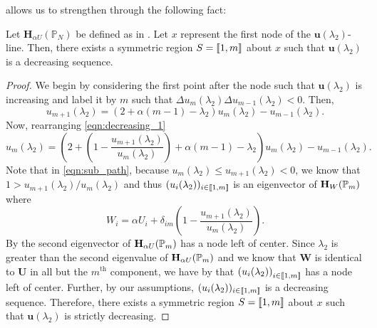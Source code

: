      allows us to strengthen  through the following fact:
        \begin{lem}\label{lem:decreasing_2}
    	Let $\mathbf{H}_{\alpha U}(\mathbb{P}_N)$ be defined as in . Let $x$ represent the first node of the $\mathbf{u}(\lambda_2)$-line. Then, there exists a symmetric region $S=\left \llbracket 1 , m \right \rrbracket$ about $x$ such that $\mathbf{u}(\lambda_2)$ is a decreasing sequence.
    \end{lem}

    \begin{proof}
    	We begin by considering the first point after the node such that $\mathbf{u}(\lambda_2)$ is increasing and label it by $m$ such that $\Delta u_m (\lambda_2) \Delta u_{m-1}(\lambda_2) < 0$. Then,
    	\begin{equation}\label{eqn:decreasing_1}
    		u_{m+1}(\lambda_2) = \left(2 + \alpha (m-1) -\lambda_2\right) u_m(\lambda_2) - u_{m-1}(\lambda_2).
    	\end{equation}
    	Now, rearranging \cref{eqn:decreasing_1}
    	\begin{equation}\label{eqn:sub_path}
    		u_m(\lambda_2) = \left(2 + \left(1 - \frac{u_{m+1}(\lambda_2)}{u_{m}(\lambda_2)}\right) +\alpha (m-1) -\lambda_2\right) u_m(\lambda_2)-u_{m-1}(\lambda_2).
    	\end{equation}
    	Note that in \cref{eqn:sub_path}, because $u_m(\lambda_2)\leq u_{m+1}(\lambda_2)<0$, we know that $1 > u_{m+1}(\lambda_2)/u_m(\lambda_2)$ and thus $(u_i(\lambda_2))_{i\in\left \llbracket 1 , m \right \rrbracket}$ is an eigenvector of  $\mathbf{H}_W(\mathbb{P}_{m})$ where
    	\begin{equation}
	  W_i = \alpha U_i + \delta_{im}\left(1 - \frac{u_{m+1}(\lambda_2)}{u_{m}(\lambda_2)}\right).
	\end{equation}
	By  the second eigenvector of $\mathbf{H}_{\alpha U}(\mathbb{P}_{m})$ has a node left of center. Since $\lambda_2$ is greater than the second eigenvalue of $\mathbf{H}_{\alpha U}(\mathbb{P}_{m})$ and we know that $\mathbf{W}$ is identical to $\mathbf{U}$ in all but the $m^{\text{th}}$ component, we have by  that $\left(u_i(\lambda_2)\right)_{i\in\left \llbracket 1 , m \right \rrbracket}$ has a node left of center. Further, by our assumptions, $(u_i(\lambda_2))_{i\in\left \llbracket 1 , m \right \rrbracket}$ is a decreasing sequence. Therefore, there exists a symmetric region $S=\left \llbracket 1 , m \right \rrbracket$ about $x$ such that $\mathbf{u}(\lambda_2)$ is strictly decreasing.
    \end{proof}

